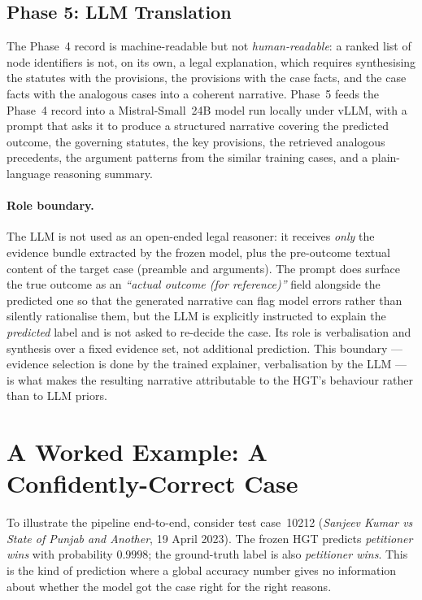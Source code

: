 \subsection{Phase 5: LLM Translation}

The Phase~4 record is machine-readable but not
\emph{human-readable}: a ranked list of node identifiers is not, on
its own, a legal explanation, which requires synthesising the
statutes with the provisions, the provisions with the case facts, and
the case facts with the analogous cases into a coherent narrative.
Phase~5 feeds the Phase~4 record into a Mistral-Small~24B model run
locally under vLLM, with a prompt that asks it to produce a
structured narrative covering the predicted outcome, the governing
statutes, the key provisions, the retrieved analogous precedents, the
argument patterns from the similar training cases, and a plain-language
reasoning summary.

\paragraph{Role boundary.}
The LLM is not used as an open-ended legal reasoner: it receives
\emph{only} the evidence bundle extracted by the frozen model, plus
the pre-outcome textual content of the target case (preamble and
arguments).  The prompt does surface the true outcome as an
\emph{``actual outcome (for reference)''} field alongside the
predicted one so that the generated narrative can flag model errors
rather than silently rationalise them, but the LLM is explicitly
instructed to explain the \emph{predicted} label and is not asked to
re-decide the case.  Its role is verbalisation and synthesis over a
fixed evidence set, not additional prediction.  This boundary ---
evidence selection is done by the trained explainer, verbalisation
by the LLM --- is what makes the resulting narrative attributable to
the HGT's behaviour rather than to LLM priors.

\section{A Worked Example: A Confidently-Correct Case}
\label{sec:worked_correct}

To illustrate the pipeline end-to-end, consider test case~10212
(\emph{Sanjeev Kumar vs State of Punjab and Another}, 19 April 2023).
The frozen HGT predicts \emph{petitioner wins} with probability
$0.9998$; the ground-truth label is also \emph{petitioner wins}.
This is the kind of prediction where a global accuracy number gives
no information about whether the model got the case right for the
right reasons.

